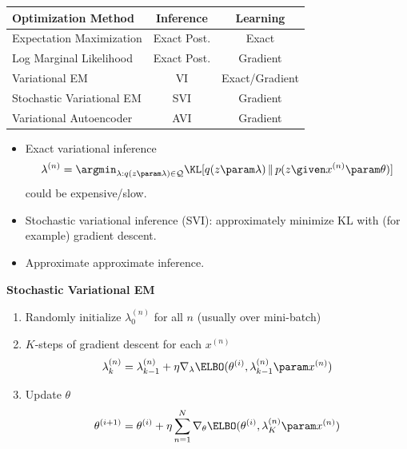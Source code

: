 \begin{frame}
\vspace{-3mm}
\begin{table}[]
    \centering
    \begin{tabular}{l c c }
    \toprule
        Optimization Method  & Inference & Learning \\
    \midrule
         Expectation Maximization & Exact Post. & Exact \\
         Log Marginal Likelihood & Exact Post. & Gradient \\
         Variational EM & VI & Exact/Gradient \\
         {\color{white} Stochastic Variational EM} & {\color{white} SVI} & {\color{white} Gradient}\\
         {\color{white} Variational Autoencoder} & {\color{white} AVI} & {\color{white} Gradient} \\
         \bottomrule
    \end{tabular}
\end{table}
\end{frame}


\begin{frame}
\begin{itemize}
    \item Exact variational inference 
\[ \lambda^{(n)} = \argmin_{\lambda : q(z \param \lambda) \in \mathcal{Q}} \KL[q(z \param \lambda)  \, \Vert \, p(z \given x^{(n)} \param \theta)]\]
could be expensive/slow.
\item Stochastic variational inference (SVI): approximately minimize KL with (for example) gradient descent.
\item Approximate approximate inference.
\end{itemize}
\end{frame}

\begin{frame}

\textbf{Stochastic Variational EM}
\begin{enumerate}
    \item Randomly initialize $\lambda^{(n)}_0$ for all $n$ (usually over mini-batch)
    \item $K$-steps of gradient descent for each $x^{(n)}$
    \[ \lambda_{k}^{(n)} = \lambda_{k-1}^{(n)} + \eta \nabla_\lambda \ELBO(\theta^{(i)}, \lambda^{(n)}_{k-1} \param x^{(n)}) \]
    \item Update $\theta$
    \[ \theta^{(i+1)} = \theta^{(i)} + \eta \sum_{n=1}^N \nabla_\theta \ELBO(\theta^{(i)}, \lambda^{(n)}_K \param x^{(n)}) \]
\end{enumerate}
\end{frame}

